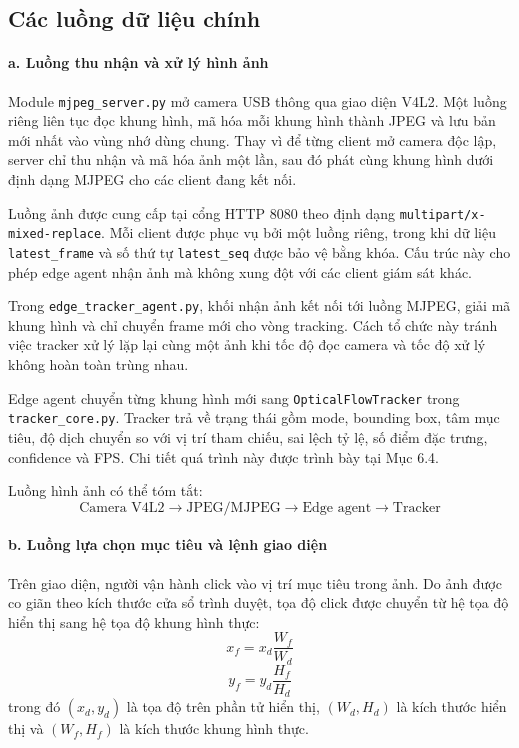 \documentclass[../DoAn.tex]{subfiles}
\begin{document}
\subsection{Các luồng dữ liệu chính}

\paragraph{a. Luồng thu nhận và xử lý hình ảnh}
Module \texttt{mjpeg\_server.py} mở camera USB thông qua giao diện V4L2. Một luồng riêng liên tục đọc khung hình, mã hóa mỗi khung hình thành JPEG và lưu bản mới nhất vào vùng nhớ dùng chung. Thay vì để từng client mở camera độc lập, server chỉ thu nhận và mã hóa ảnh một lần, sau đó phát cùng khung hình dưới định dạng MJPEG cho các client đang kết nối.

Luồng ảnh được cung cấp tại cổng HTTP 8080 theo định dạng \texttt{multipart/x-mixed-replace}. Mỗi client được phục vụ bởi một luồng riêng, trong khi dữ liệu \texttt{latest\_frame} và số thứ tự \texttt{latest\_seq} được bảo vệ bằng khóa. Cấu trúc này cho phép edge agent nhận ảnh mà không xung đột với các client giám sát khác.

Trong \texttt{edge\_tracker\_agent.py}, khối nhận ảnh kết nối tới luồng MJPEG, giải mã khung hình và chỉ chuyển frame mới cho vòng tracking. Cách tổ chức này tránh việc tracker xử lý lặp lại cùng một ảnh khi tốc độ đọc camera và tốc độ xử lý không hoàn toàn trùng nhau.

Edge agent chuyển từng khung hình mới sang \texttt{OpticalFlowTracker} trong \texttt{tracker\_core.py}. Tracker trả về trạng thái gồm mode, bounding box, tâm mục tiêu, độ dịch chuyển so với vị trí tham chiếu, sai lệch tỷ lệ, số điểm đặc trưng, confidence và FPS. Chi tiết quá trình này được trình bày tại Mục 6.4.

Luồng hình ảnh có thể tóm tắt:
\[
\text{Camera V4L2} \longrightarrow \text{JPEG/MJPEG} \longrightarrow \text{Edge agent} \longrightarrow \text{Tracker}
\]

\paragraph{b. Luồng lựa chọn mục tiêu và lệnh giao diện}
Trên giao diện, người vận hành click vào vị trí mục tiêu trong ảnh. Do ảnh được co giãn theo kích thước cửa sổ trình duyệt, tọa độ click được chuyển từ hệ tọa độ hiển thị sang hệ tọa độ khung hình thực:
\[
x_f = x_d \frac{W_f}{W_d}
\]
\[
y_f = y_d \frac{H_f}{H_d}
\]
trong đó $(x_d, y_d)$ là tọa độ trên phần tử hiển thị, $(W_d, H_d)$ là kích thước hiển thị và $(W_f, H_f)$ là kích thước khung hình thực.
\end{document}
